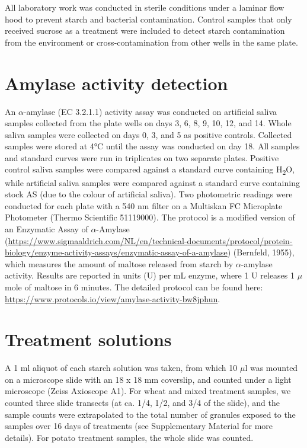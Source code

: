 \documentclass[
  letterpaper,
]{book}
\begin{document}
All laboratory work was conducted in sterile conditions under a laminar
flow hood to prevent starch and bacterial contamination. Control samples
that only received sucrose as a treatment were included to detect starch
contamination from the environment or cross-contamination from other
wells in the same plate.

\hypertarget{amylase-activity-detection}{%
\section{Amylase activity detection}\label{amylase-activity-detection}}

An \(\alpha\)-amylase (EC 3.2.1.1) activity assay was conducted on
artificial saliva samples collected from the plate wells on days 3, 6,
8, 9, 10, 12, and 14. Whole saliva samples were collected on days 0, 3,
and 5 as positive controls. Collected samples were stored at 4°C until
the assay was conducted on day 18. All samples and standard curves were
run in triplicates on two separate plates. Positive control saliva
samples were compared against a standard curve containing
H\textsubscript{2}O, while artificial saliva samples were compared
against a standard curve containing stock AS (due to the colour of
artificial saliva). Two photometric readings were conducted for each
plate with a 540 nm filter on a Multiskan FC Microplate Photometer
(Thermo Scientific 51119000). The protocol is a modified version of an
Enzymatic Assay of \(\alpha\)-Amylase
(\url{https://www.sigmaaldrich.com/NL/en/technical-documents/protocol/protein-biology/enzyme-activity-assays/enzymatic-assay-of-a-amylase})
(Bernfeld, 1955), which measures the amount of maltose released from
starch by \(\alpha\)-amylase activity. Results are reported in units (U)
per mL enzyme, where 1 U releases 1 \(\mu\)mole of maltose in 6 minutes.
The detailed protocol can be found here:
\url{https://www.protocols.io/view/amylase-activity-bw8jphun}.

\hypertarget{treatment-solutions}{%
\section{Treatment solutions}\label{treatment-solutions}}

A 1 ml aliquot of each starch solution was taken, from which 10 \(\mu\)l
was mounted on a microscope slide with an 18 x 18 mm coverslip, and
counted under a light microscope (Zeiss Axioscope A1). For wheat and
mixed treatment samples, we counted three slide transects (at ca. 1/4,
1/2, and 3/4 of the slide), and the sample counts were extrapolated to
the total number of granules exposed to the samples over 16 days of
treatments (see Supplementary Material for more details). For potato
treatment samples, the whole slide was counted.
\end{document}
